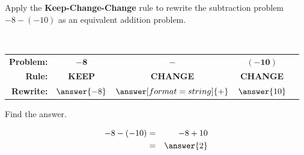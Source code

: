 \documentclass{ximera}[font=12pt]
\begin{document}
\begin{problem}
    Apply the \textbf{Keep-Change-Change} rule to rewrite the subtraction problem $-8 -(-10)$ as an equivalent 
    addition problem.  

    ~ \\[2em]
    \begin{center}
    \renewcommand{\arraystretch}{2} %
    \begin{tabular}{rcccl}
        \textbf{Problem:} & \Large $\mathbf{-8}$ & \Huge $\mathbf{-}$ & \Large $\mathbf{(-10)}$ & \\
        \textbf{Rule:}     & \textcolor{OliveGreen!90!black}{\textbf{KEEP}} & \textcolor{orange!80!black}{\textbf{CHANGE}} & 
        \textcolor{orange!80!black}{\textbf{CHANGE}} & \\
        \textbf{Rewrite:}  &  $\answer{-8}$ &  $\answer[format=string]{+}$ & $\answer{10}$ &
    \end{tabular}
    \end{center}
                                                                
    \begin{problem}
    Find the answer.                                                        

    \begin{eqnarray*}
       -8 -(-10) &=& -8 + 10 \\ 
                &=& \answer{2} 
    \end{eqnarray*}   
 
\end{problem}
\end{problem}

\end{document}
